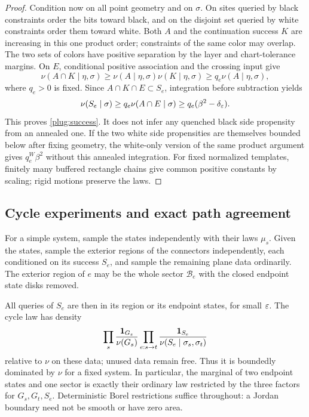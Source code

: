 \begin{proof}
Condition now on all point geometry and on $\sigma$.  On sites queried
by black constraints order the bits toward black, and on the disjoint
set queried by white constraints order them toward white.  Both $A$ and
the continuation success $K$ are increasing in this one product order;
constraints of the same color may overlap.  The two sets of colors have
positive separation by the layer and chart-tolerance margins.  On $E$,
conditional positive association and the crossing input give
\[
 \nu(A\cap K\mid\eta,\sigma)
 \ge \nu(A\mid\eta,\sigma)\nu(K\mid\eta,\sigma)
 \ge q_e\nu(A\mid\eta,\sigma),
\]
where $q_e>0$ is fixed.  Since $A\cap K\cap E\subset S_e$, integration
before subtraction yields
\[
 \nu(S_e\mid\sigma)
 \ge q_e\nu(A\cap E\mid\sigma)
 \ge q_e(\beta^2-\delta_\varepsilon).
\]
This proves \eqref{plug:success}.  It does not infer any quenched black
side propensity from an annealed one.  If the two white side propensities
are themselves bounded below after fixing geometry, the white-only
version of the same product argument gives $q_e^W\beta^2$ without this
annealed integration.  For fixed normalized templates, finitely many
buffered rectangle chains give common positive constants by scaling;
rigid motions preserve the laws.
\end{proof}

\subsection{Cycle experiments and exact path agreement}

\begin{definition}\label{def:cycle-experiment}
For a simple system, sample the states independently with their laws
$\mu_s$.  Given the states, sample the exterior regions of the connectors
independently, each conditioned on its success $S_e$, and sample the
remaining plane data ordinarily.  The exterior region of $e$ may be the
whole sector $\mathcal B_e$ with the closed endpoint state disks removed.
\end{definition}

All queries of $S_e$ are then in its region or its endpoint states, for
small $\varepsilon$.  The cycle law has density
\begin{equation}\label{plug:cycle-density}
 \prod_s\frac{\mathbf 1_{G_s}}{\nu(G_s)}
 \prod_{e:s\to t}
 \frac{\mathbf 1_{S_e}}{\nu(S_e\mid\sigma_s,\sigma_t)}
\end{equation}
relative to $\nu$ on these data; unused data remain free.  Thus it is
boundedly dominated by $\nu$ for a fixed system.  In particular, the
marginal of two endpoint states and one sector is exactly their ordinary
law restricted by the three factors for $G_s,G_t,S_e$.  Deterministic
Borel restrictions suffice throughout: a Jordan boundary need not be
smooth or have zero area.

